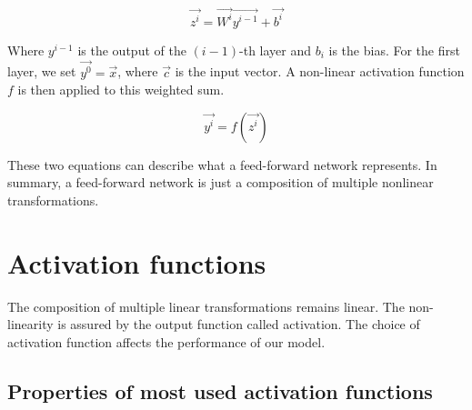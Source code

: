 \begin{equation}
    \Vec{z^{i}} = \Vec{W^{i}}\Vec{y^{i-1}} + \Vec{b^i}
    \label{weighted sum}
\end{equation}

Where $y^{i-1}$ is the output of the $(i-1)$-th layer and $b_i$ is the bias. For the first layer, we set $\Vec{y^0} = \Vec{x}$, where $\Vec{c}$ is the input vector. A non-linear activation function $f$ is then applied to this weighted sum.

\begin{equation}
    \Vec{y^i} = f(\Vec{z^i})
\end{equation}

These two equations can describe what a feed-forward network represents. In summary, a feed-forward network is just a composition of multiple nonlinear transformations.










\section{Activation functions}
\label{sec: Activation functions}
The composition of multiple linear transformations remains linear. The non-linearity is assured by the output function called activation. The choice of activation function affects the performance of our model. 
\subsection{Properties of most used activation functions}
